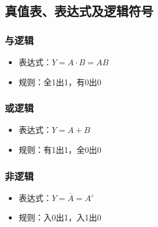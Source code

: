 \subsection{真值表、表达式及逻辑符号}
\subsubsection{与逻辑}
\begin{itemize}
    \item 表达式：$Y = A \cdot B = AB$
    \item 规则：全1出1，有0出0
\end{itemize}

\subsubsection{或逻辑}
\begin{itemize}
    \item 表达式：$Y = A + B$
    \item 规则：有1出1，全0出0
\end{itemize}

\subsubsection{非逻辑}
\begin{itemize}
    \item 表达式：$Y = \overline{A} = A'$
    \item 规则：入0出1，入1出0
\end{itemize}

